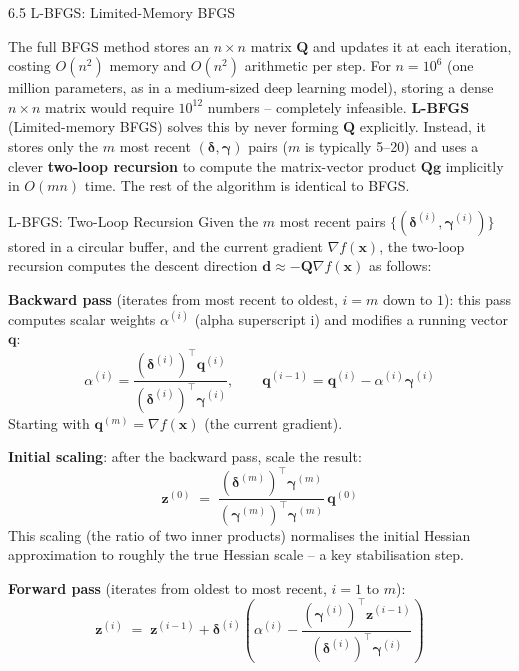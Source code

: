 \documentclass[aspectratio=169,10pt]{beamer}
\newcommand{\xbf}{\mathbf{x}}
\newcommand{\gbf}{\mathbf{g}}
\newcommand{\deltabf}{\boldsymbol{\delta}}
\newcommand{\gammabf}{\boldsymbol{\gamma}}
\begin{document}
\begin{frame}[allowframebreaks]{6.5 L-BFGS: Limited-Memory BFGS}

  The full BFGS method stores an $n \times n$ matrix $\mathbf{Q}$ and updates it
  at each iteration, costing $O(n^2)$ memory and $O(n^2)$ arithmetic per step.
  For $n = 10^6$ (one million parameters, as in a medium-sized deep learning
  model), storing a dense $n\times n$ matrix would require $10^{12}$ numbers --
  completely infeasible.  \textbf{L-BFGS} (Limited-memory BFGS) solves this by
  never forming $\mathbf{Q}$ explicitly.  Instead, it stores only the $m$ most
  recent $(\deltabf, \gammabf)$ pairs ($m$ is typically 5--20) and uses a clever
  \textbf{two-loop recursion} to compute the matrix-vector product
  $\mathbf{Q}\gbf$ implicitly in $O(mn)$ time.  The rest of the algorithm is
  identical to BFGS.

  \begin{block}{L-BFGS: Two-Loop Recursion}
    Given the $m$ most recent pairs $\{(\deltabf^{(i)}, \gammabf^{(i)})\}$ stored
    in a circular buffer, and the current gradient $\nabla f(\xbf)$, the two-loop
    recursion computes the descent direction $\mathbf{d} \approx
    -\mathbf{Q}\nabla f(\xbf)$ as follows:

    \textbf{Backward pass} (iterates from most recent to oldest, $i = m$ down to
    $1$): this pass computes scalar weights $\alpha^{(i)}$ (alpha superscript i)
    and modifies a running vector $\mathbf{q}$:
    \[
      \alpha^{(i)} = \frac{\left(\deltabf^{(i)}\right)^\top\mathbf{q}^{(i)}}
                          {\left(\deltabf^{(i)}\right)^\top\gammabf^{(i)}},
      \qquad
      \mathbf{q}^{(i-1)} = \mathbf{q}^{(i)} - \alpha^{(i)}\gammabf^{(i)}
    \]
    Starting with $\mathbf{q}^{(m)} = \nabla f(\xbf)$ (the current gradient).

    \textbf{Initial scaling}: after the backward pass, scale the result:
    \[
      \mathbf{z}^{(0)} \;=\;
      \frac{\left(\deltabf^{(m)}\right)^\top\gammabf^{(m)}}
           {\left(\gammabf^{(m)}\right)^\top\gammabf^{(m)}}\,\mathbf{q}^{(0)}
    \]
    This scaling (the ratio of two inner products) normalises the initial Hessian
    approximation to roughly the true Hessian scale -- a key stabilisation step.

    \textbf{Forward pass} (iterates from oldest to most recent, $i = 1$ to $m$):
    \[
      \mathbf{z}^{(i)} \;=\; \mathbf{z}^{(i-1)} + \deltabf^{(i)}
        \left(\alpha^{(i)} - \frac{\left(\gammabf^{(i)}\right)^\top\mathbf{z}^{(i-1)}}
                                  {\left(\deltabf^{(i)}\right)^\top\gammabf^{(i)}}\right)
    \]


\end{block}
\end{frame}
\end{document}
